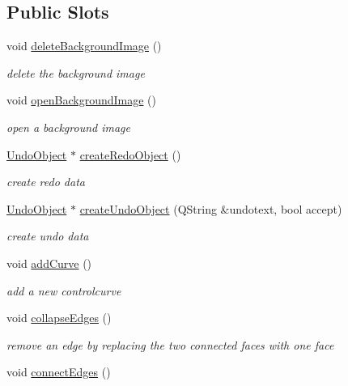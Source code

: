 \subsection*{Public Slots}
\begin{DoxyCompactItemize}
\item 
void \hyperlink{classShipCAD_1_1Controller_a766535d7bc29bf81b3b75808be19a0d0}{delete\-Background\-Image} ()
\begin{DoxyCompactList}\small\item\em delete the background image \end{DoxyCompactList}\item 
void \hyperlink{classShipCAD_1_1Controller_af1267c2c5892ba0a6f34414e241f00ea}{open\-Background\-Image} ()
\begin{DoxyCompactList}\small\item\em open a background image \end{DoxyCompactList}\item 
\hyperlink{classShipCAD_1_1UndoObject}{Undo\-Object} $\ast$ \hyperlink{classShipCAD_1_1Controller_a963975727f7929fcc519e5d61e7c693f}{create\-Redo\-Object} ()
\begin{DoxyCompactList}\small\item\em create redo data \end{DoxyCompactList}\item 
\hyperlink{classShipCAD_1_1UndoObject}{Undo\-Object} $\ast$ \hyperlink{classShipCAD_1_1Controller_a4103c49afb0e04548f678aa4847bfa0e}{create\-Undo\-Object} (Q\-String \&undotext, bool accept)
\begin{DoxyCompactList}\small\item\em create undo data \end{DoxyCompactList}\item 
void \hyperlink{classShipCAD_1_1Controller_acab9a8ee41a93303233c2cb70afa6cc1}{add\-Curve} ()
\begin{DoxyCompactList}\small\item\em add a new controlcurve \end{DoxyCompactList}\item 
void \hyperlink{classShipCAD_1_1Controller_a31ded45e333650203b2bee587e55a7ed}{collapse\-Edges} ()
\begin{DoxyCompactList}\small\item\em remove an edge by replacing the two connected faces with one face \end{DoxyCompactList}\item 
void \hyperlink{classShipCAD_1_1Controller_a8713ccaf7dccce2284dd86c9b7aa9bc0}{connect\-Edges} ()

\end{DoxyCompactItemize}
